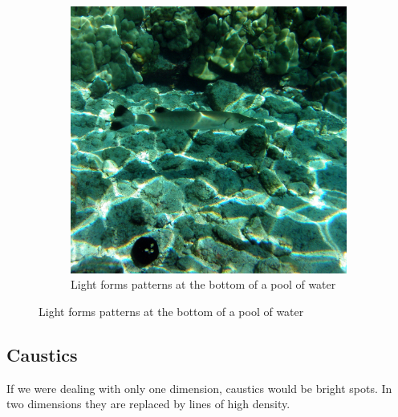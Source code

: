 \documentclass[]{article}
\begin{document}
\begin{figure}[H]
	\begin{subfigure}[b]{0.45\textwidth}
		\caption{Light forms patterns at the bottom of a pool of water\cite{inaglory2024caustics}}\label{fig:cosmo-9-pool}
		\includegraphics[width=\textwidth]{caustic}
	\end{subfigure}
\end{figure}

\subsection{Caustics}

If we were dealing with only one dimension, caustics would be bright spots. In two dimensions they are replaced by lines of high density.
\end{document}

